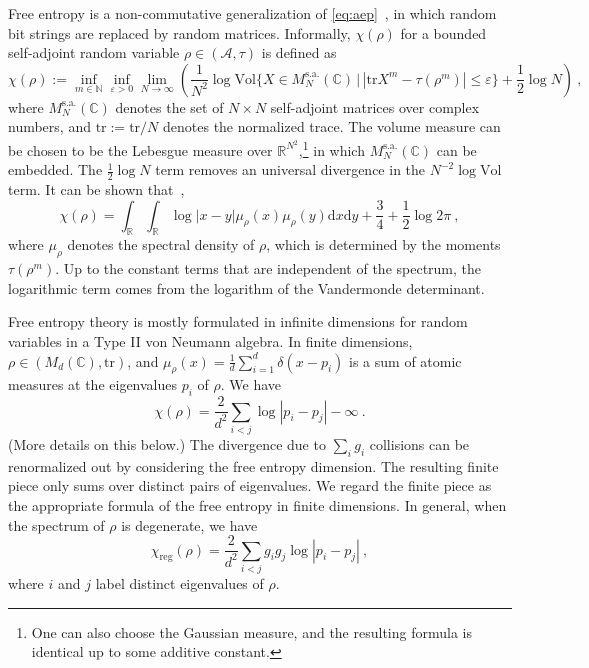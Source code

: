 \documentclass[11pt,letterpaper]{article}
\newcommand{\dd}{\mathrm{d}}
\def\eps{\varepsilon}
\def\tr{\mathrm{tr}}
\def\A{\mathcal{A}}
\begin{document}
Free entropy is a non-commutative generalization of \eqref{eq:aep}~\cite{voiculescu2002free}, in which random bit strings are replaced by random matrices. Informally, $\chi(\rho)$ for a bounded self-adjoint random variable $\rho\in(\A,\tau)$ is defined as
\begin{equation}\label{eq:free_ent}
    \chi(\rho):= \inf_{m\in\mathbb{N}}\inf_{\eps>0}\lim_{N\to\infty}\left(\frac{1}{N^2}\log \mathrm{Vol}\{ X\in M^{\mathrm{s.a.}}_N(\mathbb{C})\, \big\vert\, |\tr X^m-\tau(\rho^m)|\le\eps \}+\frac12\log N\right)\ ,
\end{equation}
where $M^{\mathrm{s.a.}}_N(\mathbb{C})$ denotes the set of $N\times N$ self-adjoint matrices over complex numbers, and $\tr:=\tr/N$ denotes the normalized trace. The volume measure can be chosen to be the Lebesgue measure over $\mathbb{R}^{N^2}$,\footnote{One can also choose the Gaussian measure, and the resulting formula is identical up to some additive constant.} in which $M^{\mathrm{s.a.}}_N(\mathbb{C})$ can be embedded. The $\frac12\log N$ term removes an universal divergence in the ${N^{-2}}\log \mathrm{Vol}$ term. It can be shown that~\cite{voiculescu1994analogues,hiai2000semicircle},
\begin{equation}\label{eq:free_ent_formula}
    \chi(\rho) = \int_{\mathbb{R}}\int_{\mathbb{R}} \log|x-y|\mu_{\rho}(x)\mu_{\rho}(y) \dd x \dd y + \frac34+\frac12\log 2\pi\ ,
\end{equation}
where $\mu_{\rho}$ denotes the spectral density of $\rho$, which is determined by the moments $\tau(\rho^m)$. Up to the constant terms that are independent of the spectrum, the logarithmic term comes from the logarithm of the Vandermonde determinant. 


Free entropy theory is mostly formulated in infinite dimensions for random variables in a Type II von Neumann algebra. In finite dimensions, $\rho\in (M_d(\mathbb{C}),\tr)$, and $\mu_\rho(x) = \frac1d\sum_{i=1}^d\delta(x-p_i)$ is a sum of atomic measures at the eigenvalues $p_i$ of $\rho$. We have
\begin{equation}
    \chi(\rho) = \frac{2}{d^2}\sum_{i< j} \log|p_i-p_j|-\infty\ .
\end{equation}
(More details on this below.) The divergence due to $\sum_i g_i$ collisions can be renormalized out by considering the free entropy dimension. The resulting finite piece only sums over distinct pairs of eigenvalues. We regard the finite piece as the appropriate formula of the free entropy in finite dimensions. In general, when the spectrum of $\rho$ is degenerate, we have
\begin{equation}\label{eq:free_ent_formula_finite}
    \chi_\mathrm{reg}(\rho) = \frac{2}{d^2}\sum_{i< j} g_ig_j\log|p_i-p_j|\ ,
\end{equation}
where $i$ and $j$ label distinct eigenvalues of $\rho$.\\
\end{document}
